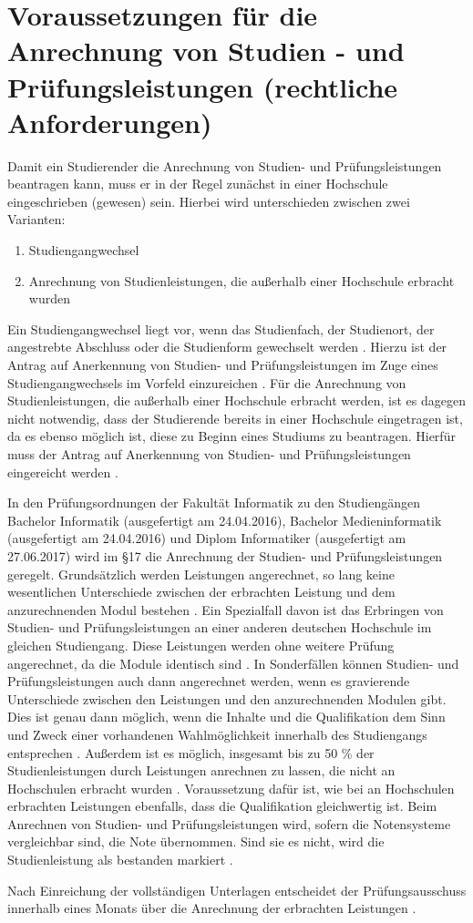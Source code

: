 \section{Voraussetzungen für die Anrechnung von Studien - und Prüfungsleistungen (rechtliche Anforderungen)}

Damit ein Studierender die Anrechnung von Studien- und Prüfungsleistungen beantragen kann, muss er in der Regel zunächst in einer Hochschule eingeschrieben (gewesen) sein. Hierbei wird unterschieden zwischen zwei Varianten:
\begin{enumerate}
\item Studiengangwechsel
\item Anrechnung von Studienleistungen, die außerhalb einer Hochschule erbracht wurden
\end{enumerate}


Ein Studiengangwechsel liegt vor, wenn das Studienfach, der Studienort, der angestrebte Abschluss oder die Studienform gewechselt werden \parencite{studiengangwechsel}. Hierzu ist der Antrag auf Anerkennung von Studien- und Prüfungsleistungen im Zuge eines Studiengangwechsels im Vorfeld einzureichen \parencite{antrag_anrechnung_wechsel}.
Für die Anrechnung von Studienleistungen, die außerhalb einer Hochschule erbracht werden, ist es dagegen nicht notwendig, dass der Studierende bereits in einer Hochschule eingetragen ist, da es ebenso möglich ist, diese zu Beginn eines Studiums zu beantragen. Hierfür muss der Antrag auf Anerkennung von Studien- und Prüfungsleistungen eingereicht werden \parencite{antrag_anrechnung}.

In den Prüfungsordnungen der Fakultät Informatik zu den Studiengängen Bachelor Informatik (ausgefertigt am 24.04.2016), Bachelor Medieninformatik (ausgefertigt am 24.04.2016) und Diplom Informatiker (ausgefertigt am 27.06.2017) wird im §17 die Anrechnung der Studien- und Prüfungsleistungen geregelt.
Grundsätzlich werden Leistungen angerechnet, so lang keine wesentlichen Unterschiede zwischen der erbrachten Leistung und dem anzurechnenden Modul bestehen \parencite{pruefungsordnung_ba}. Ein Spezialfall davon ist das Erbringen von Studien- und Prüfungsleistungen an einer anderen deutschen Hochschule im gleichen Studiengang. Diese Leistungen werden ohne weitere Prüfung angerechnet, da die Module identisch sind \parencite{pruefungsordnung_ba}. In Sonderfällen können Studien- und Prüfungsleistungen auch dann angerechnet werden, wenn es gravierende Unterschiede zwischen den Leistungen und den anzurechnenden Modulen gibt. Dies ist genau dann möglich, wenn die Inhalte und die Qualifikation dem Sinn und Zweck einer vorhandenen Wahlmöglichkeit innerhalb des Studiengangs entsprechen \parencite{pruefungsordnung_ba}.
Außerdem ist es möglich, insgesamt bis zu 50 \% der Studienleistungen durch Leistungen anrechnen zu lassen, die nicht an Hochschulen erbracht wurden \parencite{pruefungsordnung_ba}. Voraussetzung dafür ist, wie bei an Hochschulen erbrachten Leistungen ebenfalls, dass die Qualifikation gleichwertig ist.
Beim Anrechnen von Studien- und Prüfungsleistungen wird, sofern die Notensysteme vergleichbar sind, die Note übernommen. Sind sie es nicht, wird die Studienleistung als bestanden markiert \parencite{pruefungsordnung_ba}.

Nach Einreichung der vollständigen Unterlagen entscheidet der Prüfungsausschuss innerhalb eines Monats über die Anrechnung der erbrachten Leistungen \parencite{pruefungsordnung_ba}.

